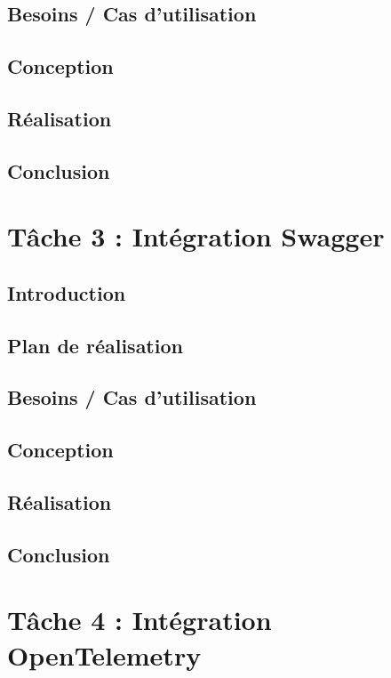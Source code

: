 \subsection*{Besoins / Cas d'utilisation}

\subsection*{Conception}

\subsection*{Réalisation}

\subsection*{Conclusion}

\section{Tâche 3 : Intégration Swagger}

\subsection*{Introduction}

\subsection*{Plan de réalisation}

\subsection*{Besoins / Cas d'utilisation}

\subsection*{Conception}

\subsection*{Réalisation}

\subsection*{Conclusion}

\section{Tâche 4 : Intégration OpenTelemetry}

